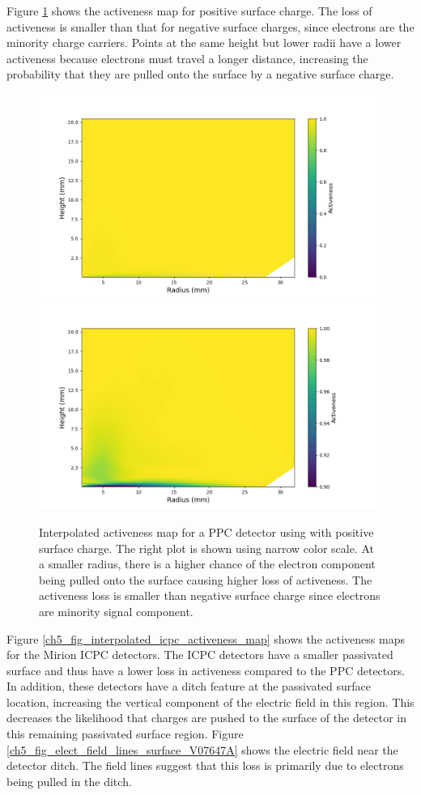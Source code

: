 Figure \ref{ch5_fig_interpolated_activeness_map_pos} shows the activeness map for positive surface charge. The loss of activeness is smaller than that for negative surface charges, since electrons are the minority charge carriers. Points at the same height but lower radii have a lower activeness because electrons must travel a longer distance, increasing the probability that they are pulled onto the surface by a negative surface charge.

\begin{figure}%
\centering
\includegraphics[trim={1.5cm 0cm 3.3cm 1cm},clip,width=0.49\linewidth]{ch5/figs/activeness_map_cubic_sc=0.3_ponama_1_5000_linear_full.png}
\includegraphics[trim={1.5cm 0cm 3.3cm 1cm},clip,width=0.49\linewidth]{ch5/figs/activeness_map_cubic_sc=0.3_ponama_1_5000_linear.png}
\caption{Interpolated activeness map for a PPC detector using \ehd with positive surface charge. The right plot is shown using narrow color scale. At a smaller radius, there is a higher chance of the electron component being pulled onto the surface causing higher loss of activeness. The activeness loss is smaller than negative surface charge since electrons are minority signal component.}
\label{ch5_fig_interpolated_activeness_map_pos}
\end{figure}

Figure \ref{ch5_fig_interpolated_icpc_activeness_map} shows the activeness maps for the Mirion ICPC detectors. The ICPC detectors have a smaller passivated surface and thus have a lower loss in activeness compared to the PPC detectors.  In addition, these detectors have a ditch feature at the passivated surface location, increasing the vertical component of the electric field in this region. This decreases the likelihood that charges are pushed to the surface of the detector in this remaining passivated surface region. Figure \ref{ch5_fig_elect_field_lines_surface_V07647A} shows the electric field near the detector ditch. The field lines suggest that this loss is primarily due to electrons being pulled in the ditch.

